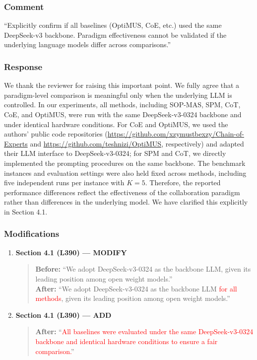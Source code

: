 \documentclass[11pt,a4paper]{article}
\begin{document}
\subsubsection{Comment}
``Explicitly confirm if all baselines (OptiMUS, CoE, etc.) used the same DeepSeek-v3 backbone. Paradigm effectiveness cannot be validated if the underlying language models differ across comparisons.''

\subsubsection{Response}
We thank the reviewer for raising this important point. We fully agree that a paradigm-level comparison is meaningful only when the underlying LLM is controlled. In our experiments, all methods, including SOP-MAS, SPM, CoT, CoE, and OptiMUS, were run with the same DeepSeek-v3-0324 backbone and under identical hardware conditions. For CoE and OptiMUS, we used the authors' public code repositories (\url{https://github.com/xzymustbexzy/Chain-of-Experts} and \url{https://github.com/teshnizi/OptiMUS}, respectively) and adapted their LLM interface to DeepSeek-v3-0324; for SPM and CoT, we directly implemented the prompting procedures on the same backbone. The benchmark instances and evaluation settings were also held fixed across methods, including five independent runs per instance with $K=5$. Therefore, the reported performance differences reflect the effectiveness of the collaboration paradigm rather than differences in the underlying model. We have clarified this explicitly in Section 4.1.

\subsubsection{Modifications}
\begin{enumerate}
\item \textbf{Section 4.1 (L390) --- MODIFY}
\begin{quote}
\textbf{Before:} ``We adopt DeepSeek-v3-0324 as the backbone LLM, given its leading position among open weight models.''\\[4pt]
\textbf{After:} ``We adopt DeepSeek-v3-0324 as the backbone LLM \textcolor{red}{for all methods}, given its leading position among open weight models.''
\end{quote}

\item \textbf{Section 4.1 (L390) --- ADD}
\begin{quote}
\textbf{After:} ``\textcolor{red}{All baselines were evaluated under the same DeepSeek-v3-0324 backbone and identical hardware conditions to ensure a fair comparison.}''
\end{quote}
\end{enumerate}
\end{document}
